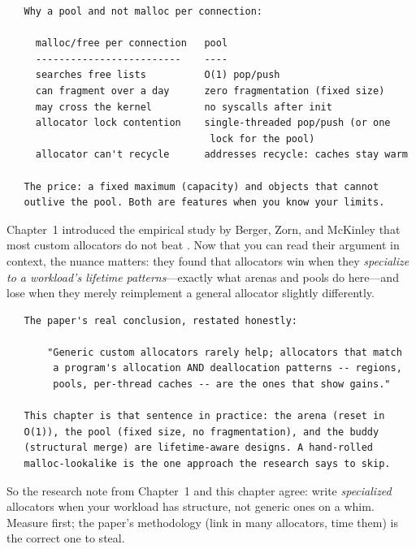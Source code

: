 \begin{verbatim}
   Why a pool and not malloc per connection:

     malloc/free per connection   pool
     -------------------------    ----
     searches free lists          O(1) pop/push
     can fragment over a day      zero fragmentation (fixed size)
     may cross the kernel         no syscalls after init
     allocator lock contention    single-threaded pop/push (or one
                                   lock for the pool)
     allocator can't recycle      addresses recycle: caches stay warm

   The price: a fixed maximum (capacity) and objects that cannot
   outlive the pool. Both are features when you know your limits.
\end{verbatim}

\begin{researchnote}
Chapter~1 introduced the empirical study by Berger, Zorn, and
McKinley that most custom allocators do not beat . Now
that you can read their argument in context, the nuance matters: they
found that allocators win when they \emph{specialize to a workload's
lifetime patterns}---exactly what arenas and pools do here---and lose
when they merely reimplement a general allocator slightly differently.

\begin{verbatim}
   The paper's real conclusion, restated honestly:

       "Generic custom allocators rarely help; allocators that match
        a program's allocation AND deallocation patterns -- regions,
        pools, per-thread caches -- are the ones that show gains."

   This chapter is that sentence in practice: the arena (reset in
   O(1)), the pool (fixed size, no fragmentation), and the buddy
   (structural merge) are lifetime-aware designs. A hand-rolled
   malloc-lookalike is the one approach the research says to skip.
\end{verbatim}

So the research note from Chapter~1 and this chapter agree: write
\emph{specialized} allocators when your workload has structure, not
generic ones on a whim. Measure first; the paper's methodology (link
in many allocators, time them) is the correct one to steal.

\end{researchnote}


